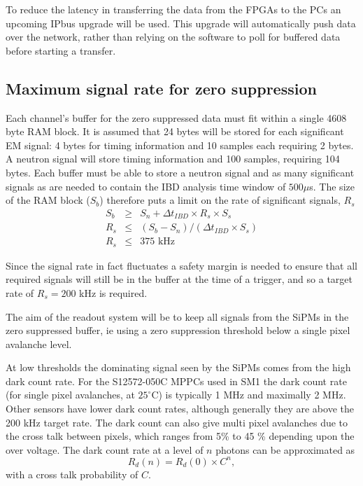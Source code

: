 \documentclass[a4paper]{article}
\begin{document}
To reduce the latency in transferring the data from the FPGAs to the PCs an upcoming IPbus upgrade will be used.
This upgrade will automatically push data over the network, rather than relying on the software to poll for buffered data before starting a transfer.

\subsection{Maximum signal rate for zero suppression}
\label{maxrates}

Each channel's buffer for the zero suppressed data must fit within a single 4608 byte RAM block.
It is assumed that 24 bytes will be stored for each significant EM signal: 4 bytes for timing information and 10 samples each requiring 2 bytes.
A neutron signal will store timing information and 100 samples, requiring 104 bytes.
Each buffer must be able to store a neutron signal and as many significant signals as are needed to contain the IBD analysis time window of $500 \mu$s.
The size of the RAM block ($S_b$) therefore puts a limit on the rate of significant signals, $R_s$
\begin{eqnarray}
    S_b &\ge& S_n + \Delta t_{IBD}\times R_s \times S_s \\
    R_s &\le& (S_b - S_n) / (\Delta t_{IBD} \times S_s)\\
    R_s &\le& 375\mbox{ kHz}
\end{eqnarray}

Since the signal rate in fact fluctuates a safety margin is needed to ensure that all required signals will still be in the buffer at the time of a trigger, and so a target rate of $R_s = 200$ kHz is required.

The aim of the readout system will be to keep all signals from the SiPMs in the zero suppressed buffer, ie using a zero suppression threshold below a single pixel avalanche level.

At low thresholds the dominating signal seen by the SiPMs comes from the high dark count rate.
For the S12572-050C MPPCs used in SM1 the dark count rate (for single pixel avalanches, at $25^{\circ}$C) is typically 1 MHz and maximally 2 MHz.
Other sensors have lower dark count rates, although generally they are above the 200 kHz target rate.
The dark count can also give multi pixel avalanches due to the cross talk between pixels, which ranges from 5\% to 45 \% depending upon the over voltage.
The dark count rate at a level of $n$ photons can be approximated as
\begin{equation}
    R_d(n) = R_d(0)\times C^n,
\end{equation}
with a cross talk probability of $C$.
\end{document}
